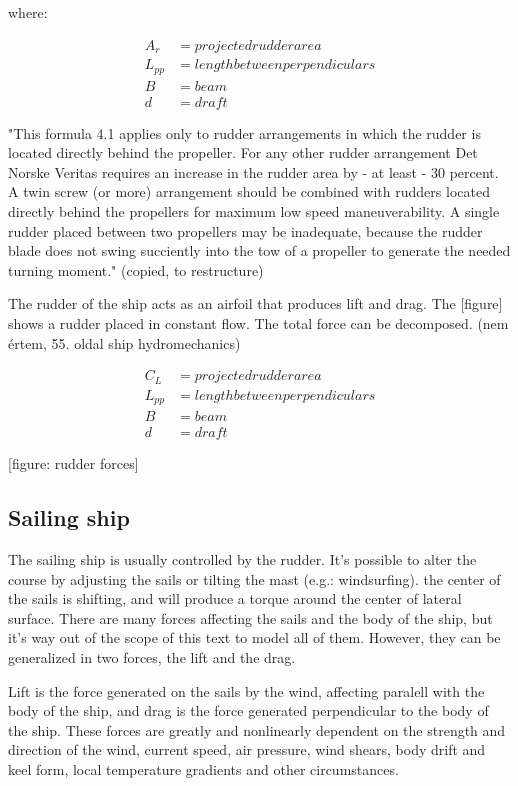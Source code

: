 where:

\begin{align}
	A_r &= projected rudder area \\
	L_{pp} &= length between perpendiculars \\
	B &= beam \\
	d &= draft
\end{align}

"This formula 4.1 applies only to rudder arrangements in which the rudder is located directly
behind the propeller. For any other rudder arrangement Det Norske Veritas requires an
increase in the rudder area by - at least - 30 percent. A twin screw (or more) arrangement
should be combined with rudders located directly behind the propellers for maximum low speed
maneuverability. A single rudder placed between two propellers may be inadequate,
because the rudder blade does not swing succiently into the tow of a propeller to generate
the needed turning moment." (copied, to restructure)

The rudder of the ship acts as an airfoil that produces lift and drag. The [figure] shows a rudder placed in constant flow. The total force can be decomposed. (nem értem, 55. oldal ship hydromechanics)

\begin{align}
	C_L &= projected rudder area \\
	L_{pp} &= length between perpendiculars \\
	B &= beam \\
	d &= draft
\end{align}

[figure: rudder forces]

\subsection{Sailing ship}

The sailing ship is usually controlled by the rudder. It’s possible to alter the course by adjusting the sails or tilting the mast (e.g.: windsurfing). the center of the sails is shifting, and will produce a torque around the center of lateral surface.
There are many forces affecting the sails and the body of the ship, but it’s way out of the scope of this text to model all of them. However, they can be generalized in two forces, the lift and the drag.

Lift is the force generated on the sails by the wind, affecting paralell with the body of the ship, and drag is the force generated perpendicular to the body of the ship. These forces are greatly and nonlinearly dependent on the strength and direction of the wind, current speed, air pressure, wind shears, body drift and keel form, local temperature gradients and other circumstances.


